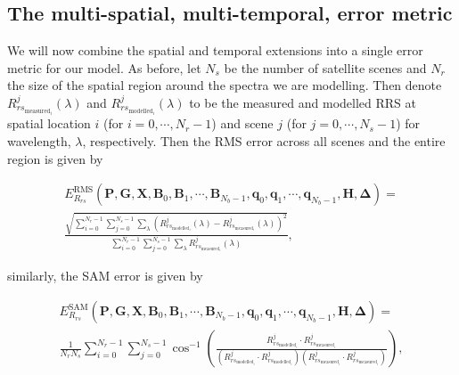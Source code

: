 \documentclass[12pt]{article}
\numberwithin{equation}{section}
\begin{document}
	\subsection{The multi-spatial, multi-temporal, error metric}

We will now combine the spatial and temporal extensions into a single error metric for our 
model. As before, let $N_s$ be the number of satellite scenes and $N_r$ the size of the spatial 
region around the spectra we are modelling. Then denote $R_{rs_{{\text{measured}}_i}}^j(\lambda)$ 
and $R_{rs_{{\text{modelled}}_i}}^j(\lambda)$ to be the measured and modelled RRS at spatial 
location $i$ (for $i=0,\cdots,N_r-1$) and scene $j$ (for $j=0,\cdots,N_s-1$) for wavelength,
$\lambda$, respectively. Then the RMS error across all scenes and the entire region is 
given by
\begin{linenomath}
\begin{multline}
E_{R_{rs}}^{\text{RMS}}\left(\textbf{P}, \textbf{G}, \textbf{X}, \textbf{B}_0, \textbf{B}_1, \cdots, \textbf{B}_{N_b-1}, \textbf{q}_0, \textbf{q}_1, \cdots, \textbf{q}_{N_b-1}, \textbf{H}, \mathbf{\Delta}\right) = \\
\frac{\sqrt{\sum\limits_{i=0}^{N_r-1}\sum\limits_{j=0}^{N_s-1}\sum\limits_{\lambda} \left(R_{rs_{{\text{modelled}}_i}}^j(\lambda) - R_{rs_{{\text{measured}}_i}}^j(\lambda)\right)^2}}
	{\sum\limits_{i=0}^{N_r-1}\sum\limits_{j=0}^{N_s-1}\sum\limits_{\lambda} R_{rs_{{\text{measured}}_i}}^j(\lambda)},\label{error_RRS}
\end{multline}
\end{linenomath}

\medskip

\noindent similarly, the SAM error is given by

\medskip

\begin{linenomath}
\begin{multline}
E_{R_{rs}}^{\text{SAM}}\left(\textbf{P}, \textbf{G}, \textbf{X}, \textbf{B}_0, \textbf{B}_1, \cdots, \textbf{B}_{N_b-1}, \textbf{q}_0, \textbf{q}_1, \cdots, \textbf{q}_{N_b-1}, \textbf{H}, \mathbf{\Delta}\right) =  \\
\frac{1}{N_r N_s}\sum\limits_{i=0}^{N_r-1}\sum\limits_{j=0}^{N_s-1} \cos^{-1}\left( \frac{R_{rs_{{\text{modelled}}_i}}^j \cdot R_{rs_{{\text{measured}}_i}}^j}
	{\left(R_{rs_{{\text{modelled}}_i}}^j \cdot R_{rs_{{\text{modelled}}_i}}^j\right) \left(R_{rs_{{\text{measured}}_i}}^j \cdot R_{rs_{{\text{measured}}_i}}^j\right)} \right),\label{error_SAM}
\end{multline}
\end{linenomath}
\end{document}

